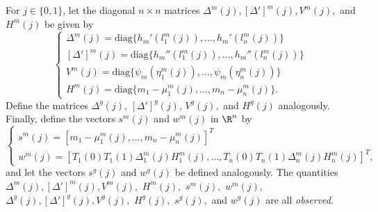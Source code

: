 \documentclass[12pt]{article}
\begin{document}
\begin{appendices}
For $j \in \{0,1\}$, let the diagonal $n \times n$ matrices $\Delta^m(j), [\Delta']^m(j), V^m(j),$ and $H^m(j)$ be given by
$$\begin{cases}
\Delta^m(j) = \textrm{diag} \{ h_m'(l_1^m(j)), \dots, h_m'( l_n^m(j) ) \} \\
[\Delta']^m(j) = \textrm{diag} \{ h_m''(l_1^m(j)), \dots, h_m''( l_n^m(j)) \} \\
V^m(j) = \textrm{diag} \{ \psi_m( \eta^m_1(j)), \dots, \psi_m( \eta^m_n(j)) \} \\
H^m(j) = \textrm{diag} \{ m_1 - \mu_1^m(j), \dots, m_n - \mu_n^m(j)\} .
\end{cases}
$$
Define the matrices $\Delta^g(j)$, $[\Delta']^{g}(j)$, $V^g(j),$ and $H^g(j)$ analogously. Finally, define the vectors $s^m(j)$ and $w^m(j)$ in $\R^n$ by 
$$ \begin{cases}
s^m(j) = [m_1 - \mu_1^m(j), \dots, m_n - \mu_n^m(j) ]^T \\ w^m(j) = [ T_1(0)T_1(1)\Delta^m_1(j) H^m_1(j), \dots, T_n(0)T_n(1)\Delta_n^m(j) H_n^m(j)]^T,
\end{cases} $$
and let the vectors $s^g(j)$ and $w^g(j)$ be defined analogously. The quantities $\Delta^m(j), [\Delta']^m(j), V^m(j),$ $H^m(j),$ $s^m(j),$ $w^m(j),$ $\Delta^g(j), [\Delta']^g(j), V^g(j),$ $H^g(j),$ $s^g(j),$ and $w^g(j)$ are all \textit{observed}. 


\end{appendices}
\end{document}

